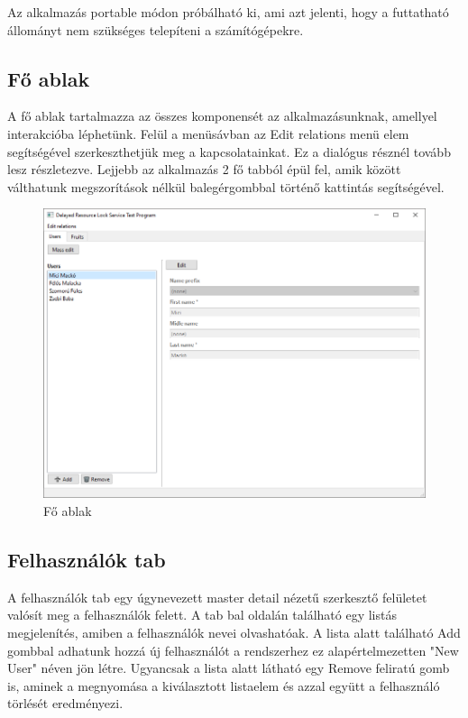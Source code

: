 Az alkalmazás portable módon próbálható ki, ami azt jelenti, hogy a futtatható állományt nem szükséges telepíteni a számítógépekre.

\subsection{Fő ablak}

A fő ablak tartalmazza az összes komponensét az alkalmazásunknak, amellyel interakcióba léphetünk. Felül a menüsávban az Edit relations menü elem segítségével szerkeszthetjük meg a kapcsolatainkat. Ez a dialógus résznél tovább lesz részletezve. Lejjebb az alkalmazás 2 fő tabból épül fel, amik között válthatunk megszorítások nélkül balegérgombbal történő kattintás segítségével.

\begin{figure}[H]
	\centering
	\includegraphics[width=1\textwidth]{images/UsersTab.png}
	\caption{Fő ablak}
	\label{fig:main_window}
\end{figure}

\subsection{Felhasználók tab}

A felhasználók tab egy úgynevezett master detail nézetű szerkesztő felületet valósít meg a felhasználók felett. A tab bal oldalán található egy listás megjelenítés, amiben a felhasználók nevei olvashatóak. A lista alatt található Add gombbal adhatunk hozzá új felhasználót a rendszerhez ez alapértelmezetten "New User" néven jön létre. Ugyancsak a lista alatt látható egy Remove feliratú gomb is, aminek a megnyomása a kiválasztott listaelem és azzal együtt a felhasználó törlését eredményezi.


